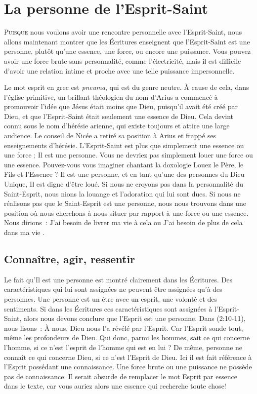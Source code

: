 \chapter{La personne de l'Esprit-Saint}

\lettrine[lines=3]{P}{uisque} nous voulons avoir une rencontre personnelle avec l'Esprit-Saint, nous allons maintenant montrer que les Écritures enseignent que l'Esprit-Saint est une personne, plutôt qu'une essence, une force, ou encore une puissance. Vous pouvez avoir une force brute sans personnalité, comme l'électricité, mais il est difficile d'avoir une relation intime et proche avec une telle puissance impersonnelle.

Le mot \og esprit \fg{} en grec est \emph{pneuma}, qui est du genre neutre. À cause de cela, dans l'église primitive, un brillant théologien du nom d'Arius a commencé à promouvoir l'idée que Jésus était moins que Dieu, puisqu'il avait été créé par Dieu, et que l'Esprit-Saint était seulement une \og essence \fg{} de Dieu. Cela devint connu sous le nom d'hérésie arienne, qui existe toujours et attire une large audience. Le conseil de Nicée a retiré sa position à Arius et frappé ses enseignements d'hérésie. L'Esprit-Saint est plus que simplement une essence ou une force ; Il est une personne. Vous ne devriez pas simplement louer une force ou une essence. Pouvez-vous vous imaginer chantant la doxologie \og Louez le Père, le Fils et l'Essence \fg{} ? Il est une personne, et en tant qu'une des personnes du Dieu Unique, Il est digne d'être loué. Si nous ne croyons pas dans la personnalité du Saint-Esprit, nous nions la louange et l'adoration qui lui sont dues. Si nous ne réalisons pas que le Saint-Esprit est une personne, nous nous trouvons dans une position où nous cherchons à nous situer par rapport à une force ou une essence. Nous dirions~: \og J'ai besoin de livrer ma vie à cela \fg{} ou \og J'ai besoin de plus de cela dans ma vie .\fg


\section*{Connaître, agir, ressentir}

Le fait qu'Il est une personne est montré clairement dans les Écritures. Des caractéristiques qui lui sont assignées ne peuvent être assignées qu'à des personnes. Une personne est un être avec un esprit, une volonté et des sentiments. Si dans les Écritures ces caractéristiques sont assignées à l'Esprit-Saint, alors nous devons conclure que l'Esprit est une personne. Dans (2:10-11), nous lisons~: \og À nous, Dieu nous l'a révélé par l'Esprit. Car l'Esprit sonde tout, même les profondeurs de Dieu. Qui donc, parmi les hommes, sait ce qui concerne l'homme, si ce n'est l'esprit de l'homme qui est en lui ? De même, personne ne connaît ce qui concerne Dieu, si ce n'est l'Esprit de Dieu. \fg{} Ici il est fait référence à l'Esprit possédant une connaissance. Une force brute ou une puissance ne possède pas de connaissance. Il serait absurde de remplacer le mot \og Esprit \fg{} par \og essence \fg{} dans le texte, car vous auriez alors une \og essence \fg{} qui recherche toute chose!

